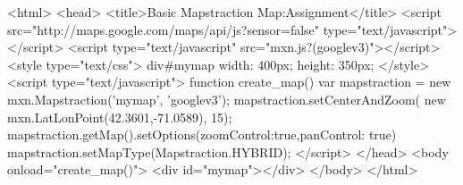 <html>
 <head>
 <title>Basic Mapstraction Map:Assignment</title>
 <script
 src="http://maps.google.com/maps/api/js?sensor=false"
 type="text/javascript"></script>
 <script type="text/javascript" src="mxn.js?(googlev3)"></script>
 <style type="text/css">
 div#mymap {
 width: 400px;
 height: 350px;
 }
 </style>
 <script type="text/javascript">
 function create_map() {
 var mapstraction = new mxn.Mapstraction('mymap', 'googlev3');
 mapstraction.setCenterAndZoom(
 new mxn.LatLonPoint(42.3601,-71.0589), 15);
 mapstraction.getMap().setOptions({zoomControl:true,panControl: true})
 mapstraction.setMapType(Mapstraction.HYBRID);
 }
 </script>
 </head>
 <body onload="create_map()">
 <div id="mymap"></div>
 </body>
</html>
